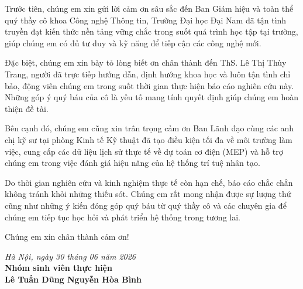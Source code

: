 
Trước tiên, chúng em xin gửi lời cảm ơn sâu sắc đến Ban Giám hiệu và toàn thể quý thầy cô khoa Công nghệ Thông tin, Trường Đại học Đại Nam đã tận tình truyền đạt kiến thức nền tảng vững chắc trong suốt quá trình học tập tại trường, giúp chúng em có đủ tư duy và kỹ năng để tiếp cận các công nghệ mới.

Đặc biệt, chúng em xin bày tỏ lòng biết ơn chân thành đến ThS. Lê Thị Thùy Trang, người đã trực tiếp hướng dẫn, định hướng khoa học và luôn tận tình chỉ bảo, động viên chúng em trong suốt thời gian thực hiện báo cáo nghiên cứu này. Những góp ý quý báu của cô là yếu tố mang tính quyết định giúp chúng em hoàn thiện đề tài.

Bên cạnh đó, chúng em cũng xin trân trọng cảm ơn Ban Lãnh đạo cùng các anh chị kỹ sư tại phòng Kinh tế Kỹ thuật đã tạo điều kiện tối đa về môi trường làm việc, cung cấp các dữ liệu lịch sử thực tế về dự toán cơ điện (MEP) và hỗ trợ chúng em trong việc đánh giá hiệu năng của hệ thống trí tuệ nhân tạo.

Do thời gian nghiên cứu và kinh nghiệm thực tế còn hạn chế, báo cáo chắc chắn không tránh khỏi những thiếu sót. Chúng em rất mong nhận được sự lượng thứ cũng như những ý kiến đóng góp quý báu từ quý thầy cô và các chuyên gia để chúng em tiếp tục học hỏi và phát triển hệ thống trong tương lai.

Chúng em xin chân thành cảm ơn!

\vspace{1cm}
\begin{flushright}
\textit{Hà Nội, ngày 30 tháng 06 năm 2026} \\
\textbf{Nhóm sinh viên thực hiện} \\[1.5cm]
\textbf{Lê Tuấn Dũng \hspace{1cm} Nguyễn Hòa Bình}
\end{flushright}
